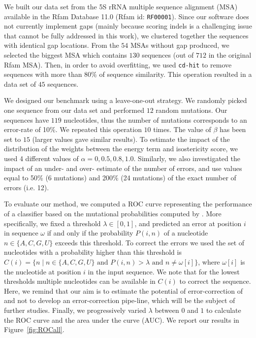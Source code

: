We built our data set from the 5S rRNA multiple sequence alignment (MSA) available in the Rfam Database 11.0 (Rfam id: \texttt{RF00001}).
Since our software does not currently implement gaps (mainly because scoring indels is a challenging issue that cannot be fully addressed
in this work),  we clustered together the sequences with identical gap locations. From the $54$ MSAs without gap produced, we selected the
biggest MSA  which contains $130$ sequences (out of $712$ in the original Rfam MSA). Then, in order to avoid overfitting, we used \texttt{cd-hit}
\cite{Li:2006fk} to remove sequences with more than 80\% of sequence similarity. This operation resulted in a data set of $45$ sequences. 

We designed our benchmark using a leave-one-out strategy. We randomly picked one sequence from our data set and performed $12$ random
mutations. Our sequences have $119$ nucleotides, thus the number of mutations corresponds to an error-rate of 10\%. We repeated this operation 
$10$ times. The value of $\beta$ has been set to $15$ (larger values gave similar results). To estimate the impact of the distribution of the weights
between the energy term and isostericity  score, we used 4 different values of $\alpha = {0, 0.5, 0.8, 1.0}$. Similarly, we also investigated the impact of 
an under- and over- estimate of the number of errors, and use values equal to 50\% (6 mutations) and 200\% (24 mutations) of the exact number of
errors (i.e. 12).

To evaluate our method, we computed a ROC curve representing the performance of a classifier based on the mutational probabilities computed
by \RNApyro. More specifically, we fixed a threshold $\lambda \in [0,1]$, and predicted an error at position $i$ in sequence $\omega$ if and only if the
probability $P(i,n)$ of a nucleotide $n \in \{ A,C,G,U \}$ exceeds this threshold. To correct the errors we used the set of nucleotides with a probability
higher than this threshold is  $C(i) = \{ n \; | \;  n \in \{ A,C,G,U \} \mbox{ and } P(i,n) > \lambda \mbox{ and }  n \neq \omega[i] \}$, where $\omega[i]$ is
the nucleotide at position $i$ in the input sequence. We note that for the lowest thresholds multiple nucleotides can be available in $C(i)$ to correct
the sequence. Here, we remind that our aim is to estimate the potential of error-correction of \RNApyro and not to develop an error-correction pipe-line, which  
will be the subject of further studies. Finally, we progressively varied $\lambda$ between $0$ and $1$ to calculate the ROC curve and the area
under the curve (AUC). We report our results in Figure~\ref{fig:ROCall}. 

